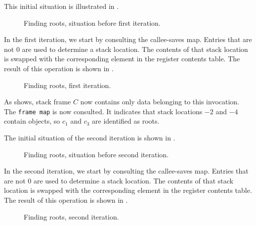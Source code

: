 This initial situation is illustrated in
.

\begin{figure}
\begin{center}
\end{center}
\caption{\label{fig-root-finding-example-1}
Finding roots, situation before first iteration.}
\end{figure}

In the first iteration, we start by consulting the callee-saves map.
Entries that are not $0$ are used to determine a stack location.  The
contents of that stack location is swapped with the corresponding
element in the register contents table.  The result of this operation
is shown in .

\begin{figure}
\begin{center}
\end{center}
\caption{\label{fig-root-finding-example-1b}
Finding roots, first iteration.}
\end{figure}

As  shows, stack frame $C$ now
contains only data belonging to this invocation.  The \texttt{frame
  map} is now consulted.  It indicates that stack locations $-2$ and
$-4$ contain \commonlisp{} objects, so $c_1$ and $c_3$ are identified
as roots.

The initial situation of the second iteration is shown in
.

\begin{figure}
\begin{center}
\end{center}
\caption{\label{fig-root-finding-example-2}
Finding roots, situation before second iteration.}
\end{figure}

In the second iteration, we start by consulting the callee-saves map.
Entries that are not $0$ are used to determine a stack location.  The
contents of that stack location is swapped with the corresponding
element in the register contents table.  The result of this operation
is shown in .

\begin{figure}
\begin{center}
\end{center}
\caption{\label{fig-root-finding-example-2b}
Finding roots, second iteration.}
\end{figure}

